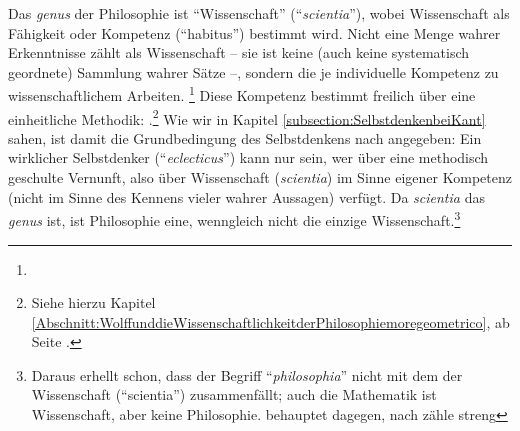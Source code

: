 \begin{nummerierung}

\item Das \emph{genus} der Philosophie ist \enquote{Wissenschaft}
(\enquote{\emph{scientia}}), wobei Wissenschaft als Fähigkeit oder Kompetenz
(\enquote{habitus}) bestimmt wird. Nicht eine Menge wahrer Erkenntnisse zählt
als Wissenschaft -- sie ist keine (auch keine systematisch geordnete) Sammlung wahrer Sätze --, sondern die je individuelle
Kompetenz zu wissenschaftlichem Arbeiten. \footnote{} Diese Kompetenz
bestimmt  freilich über eine einheitliche Methodik: .\footnote{Siehe hierzu Kapitel \ref{Abschnitt:WolffunddieWissenschaftlichkeitderPhilosophiemoregeometrico}, ab Seite
\pageref{Abschnitt:WolffunddieWissenschaftlichkeitderPhilosophiemoregeometrico}.}
Wie wir in Kapitel \ref{subsection:SelbstdenkenbeiKant} sahen, ist damit die
Grundbedingung des Selbstdenkens nach
 angegeben:
Ein wirklicher Selbstdenker (\enquote{\emph{eclecticus}}) kann nur sein, wer
über eine methodisch geschulte Vernunft, also über Wissenschaft
(\emph{scientia}) im Sinne eigener Kompetenz (nicht im Sinne des Kennens vieler
wahrer Aussagen) verfügt. Da \emph{scientia} das \emph{genus} ist, ist
Philosophie eine, wenngleich nicht die einzige Wissenschaft.\footnote{Daraus
erhellt schon, dass der Begriff \enquote{\emph{philosophia}} nicht mit dem der Wissenschaft
(\enquote{scientia}) zusammenfällt; auch die Mathematik ist Wissenschaft, aber keine
Philosophie. 
behauptet dagegen, nach  zähle streng
}
\end{nummerierung}
